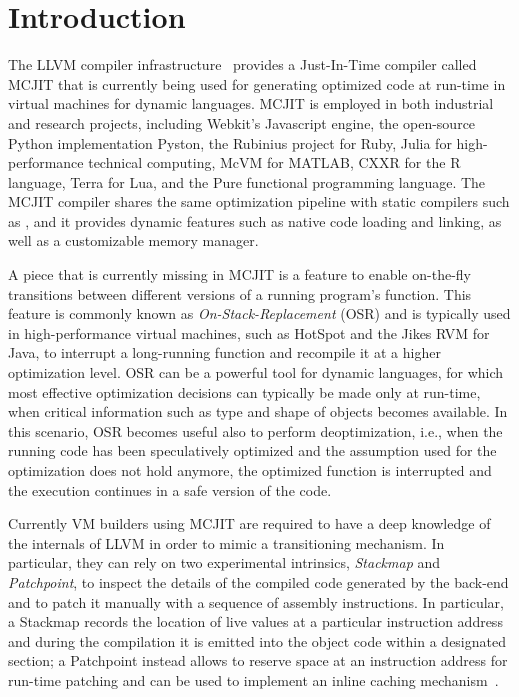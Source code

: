 
\section{Introduction}
\label{se:intro}

The LLVM compiler infrastructure~\cite{lattner2004llvm} provides a Just-In-Time compiler called MCJIT that is currently being used for generating optimized code at run-time in virtual machines for dynamic languages. MCJIT is employed in both industrial and research projects, including Webkit's Javascript engine, the open-source Python implementation Pyston, the Rubinius project for Ruby, Julia for high-performance technical computing, McVM for MATLAB, CXXR for the R language, Terra for Lua, and the Pure functional programming language. The MCJIT compiler shares the same optimization pipeline with static compilers such as \clang, and it provides dynamic features such as native code loading and linking, as well as a customizable memory manager.

A piece that is currently missing in MCJIT is a feature to enable on-the-fly transitions between different versions of a running program's function. This feature is commonly known as {\em On-Stack-Replacement} (OSR) and is typically used in high-performance virtual machines, such as HotSpot and the Jikes RVM for Java, to interrupt a long-running function and recompile it at a higher optimization level. OSR can be a powerful tool for dynamic languages, for which most effective optimization decisions can typically be made only at run-time, when critical information such as type and shape of objects becomes available. In this scenario, OSR becomes useful also to perform deoptimization, i.e., when the running code has been speculatively optimized and the assumption used for the optimization does not hold anymore, the optimized function is interrupted and the execution continues in a safe version of the code.

Currently VM builders using MCJIT are required to have a deep knowledge of the internals of LLVM in order to mimic a transitioning mechanism. In particular, they can rely on two experimental intrinsics, {\em Stackmap} and {\em Patchpoint}, to inspect the details of the compiled code generated by the back-end and to patch it manually with a sequence of assembly instructions. In particular, a Stackmap records the location of live values at a particular instruction address and during the compilation it is emitted into the object code within a designated section; a Patchpoint instead allows to reserve space at an instruction address for run-time patching and can be used to implement an inline caching mechanism~\cite{webkit14}.%

